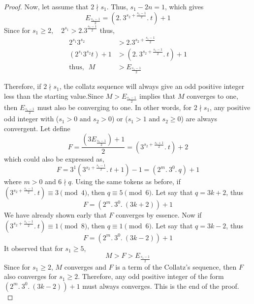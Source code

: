 \documentclass[14pt,a4paper]{article}
\theoremstyle{plain}
\begin{document}
\begin{proof}
    Now, let assume that $2\nmid s_{1}$. Thus, $s_{1}-2n=1$, which gives
    \begin{equation}
        E_{\frac{s_{1}-1}{2}} = (2.~3^{s_{2}+\frac{s_{1}-1}{2}}.~t)+1
    \end{equation}
    Since for $s_{1}\geq 2$, ~ $2^{s_{1}}> 2.3^{\frac{s_{1}-1}{2}}$ thus,
    \begin{align}
        2^{s_{1}}3^{s_{2}} &> 2.3^{s_{2}+\frac{s_{1}-1}{2}} \\
        (2^{s_{1}}3^{s_{2}}t)+1 &> (2.~3^{s_{2}+\frac{s_{1}-1}{2}}.~t)+1\\
        \text{thus, ~} M &> E_{\frac{s_{1}-1}{2}}
    \end{align}
    
    Therefore, if $2\nmid s_{1}$, the collatz sequence will always give an odd positive integer less than the starting value.Since $ M > E_{\frac{s_{1}-1}{2}}$ implies that $M$ converges to one, then $E_{\frac{s_{1}-1}{2}}$  must also be converging to one. In other words, for $2\nmid s_{1}$, any positive odd integer with ($s_{1}>0 \text{ and } s_{2}>0$) or ($s_{1}>1 \text{ and } s_{2}\geq 0$) are always convergent. Let define 
    \begin{equation}
        F = \frac{(3E_{\frac{s_{1}-1}{2}})+1}{2} =  (3^{s_{2}+\frac{s_{1}+1}{2}}.~t)+2
    \end{equation}
    which could also be expressed as, 
    \begin{equation}
        F  = 3^{1}(3^{s_{2}+\frac{s_{1}-1}{2}}.~t+1)-1 = (2^{m}.~3^{0}.~q)+1
    \end{equation}
    where $m>0$ and $6\nmid q$. Using the same tokens as before, if $(3^{s_{2}+\frac{s_{1}-1}{2}}.~t) \equiv 3 \pmod{4}$, then $q \equiv 5 \pmod{6}$. Let say that $q = 3k+2$, thus 
    \begin{equation}
        F = (2^{m}.~3^{0}.~(3k+2))+1
    \end{equation}
    We have already shown early that $F$ converges by essence. Now if $(3^{s_{2}+\frac{s_{1}-1}{2}}.~t) \equiv 1 \pmod{8}$, then $q \equiv 1 \pmod{6}$. Let say that $q = 3k-2$, thus 
    \begin{equation}
        F = (2^{m}.~3^{0}.~(3k-2))+1
    \end{equation}
    It observed that for $s_{1}\geq 5$, 
    \begin{equation}
        M> F > E_{\frac{s_{1}-1}{2}}
    \end{equation}
    Since for $s_{1}\geq 2$, $M$ converges and $F$ is a term of the Collatz's sequence, then $F$ also converges for $s_{1}\geq 2$. Therefore, any odd positive integer of the form $(2^{m}.~3^{0}.~(3k-2))+1$ must always converges. This is the end of the proof.\\
    

\end{proof}
\end{document}
